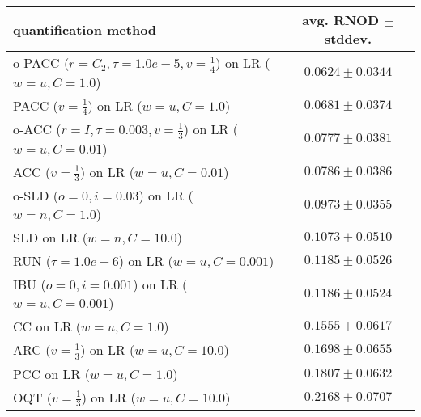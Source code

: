 \begin{tabular}{lc}
  \toprule
  quantification method & avg. RNOD $\pm$ stddev. \\
  \midrule
  o-PACC ($r=C_2, \tau=1.0e-5, v=\frac{1}{4}$) on LR ($w=u, C=1.0$) & $\mathbf{0.0624 \pm 0.0344}$ \\
  PACC ($v=\frac{1}{4}$) on LR ($w=u, C=1.0$) & $0.0681 \pm 0.0374$ \\
  o-ACC ($r=I, \tau=0.003, v=\frac{1}{3}$) on LR ($w=u, C=0.01$) & $0.0777 \pm 0.0381$ \\
  ACC ($v=\frac{1}{3}$) on LR ($w=u, C=0.01$) & $0.0786 \pm 0.0386$ \\
  o-SLD ($o=0, i=0.03$) on LR ($w=n, C=1.0$) & $0.0973 \pm 0.0355$ \\
  SLD on LR ($w=n, C=10.0$) & $0.1073 \pm 0.0510$ \\
  RUN ($\tau=1.0e-6$) on LR ($w=u, C=0.001$) & $0.1185 \pm 0.0526$ \\
  IBU ($o=0, i=0.001$) on LR ($w=u, C=0.001$) & $0.1186 \pm 0.0524$ \\
  CC on LR ($w=u, C=1.0$) & $0.1555 \pm 0.0617$ \\
  ARC ($v=\frac{1}{3}$) on LR ($w=u, C=10.0$) & $0.1698 \pm 0.0655$ \\
  PCC on LR ($w=u, C=1.0$) & $0.1807 \pm 0.0632$ \\
  OQT ($v=\frac{1}{3}$) on LR ($w=u, C=10.0$) & $0.2168 \pm 0.0707$ \\
  \bottomrule
\end{tabular}
